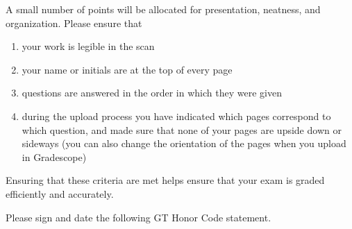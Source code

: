 \documentclass[12pt]{exam}
\begin{document}
\begin{questions}



    \newpage 

    \question[1] A small number of points will be allocated for presentation, neatness, and organization. Please ensure that
    \begin{enumerate}
        \item your work is legible in the scan
        \item your name or initials are at the top of every page
        \item questions are answered in the order in which they were given
        \item during the upload process you have indicated which pages correspond to which question, and made sure that none of your pages are upside down or sideways (you can also change the orientation of the pages when you upload in Gradescope)
    \end{enumerate}
    Ensuring that these criteria are met helps ensure that your exam is graded efficiently and accurately. 
    


    
\end{questions}
    
    Please sign and date the following GT Honor Code statement. \\ 
    
\end{document}
